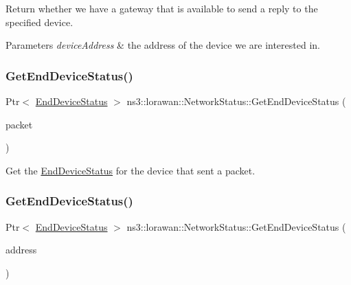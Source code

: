 Return whether we have a gateway that is available to send a reply to the specified device.


\begin{DoxyParams}{Parameters}
{\em device\+Address} & the address of the device we are interested in. \\
\hline
\end{DoxyParams}
\mbox{\label{classns3_1_1lorawan_1_1NetworkStatus_a83251eb432e1e0c22cbe4a6e2ad9ec52}} 
\subsubsection{\texorpdfstring{Get\+End\+Device\+Status()}{GetEndDeviceStatus()}\hspace{0.1cm}{\footnotesize\ttfamily [1/2]}}
{\footnotesize\ttfamily Ptr$<$ \hyperlink{classns3_1_1lorawan_1_1EndDeviceStatus}{End\+Device\+Status} $>$ ns3\+::lorawan\+::\+Network\+Status\+::\+Get\+End\+Device\+Status (\begin{DoxyParamCaption}\item[{Ptr$<$ Packet const $>$}]{packet }\end{DoxyParamCaption})}

Get the \hyperlink{classns3_1_1lorawan_1_1EndDeviceStatus}{End\+Device\+Status} for the device that sent a packet. \mbox{\label{classns3_1_1lorawan_1_1NetworkStatus_a4f75e1f86d6e90931e71d362222c39b3}} 
\subsubsection{\texorpdfstring{Get\+End\+Device\+Status()}{GetEndDeviceStatus()}\hspace{0.1cm}{\footnotesize\ttfamily [2/2]}}
{\footnotesize\ttfamily Ptr$<$ \hyperlink{classns3_1_1lorawan_1_1EndDeviceStatus}{End\+Device\+Status} $>$ ns3\+::lorawan\+::\+Network\+Status\+::\+Get\+End\+Device\+Status (\begin{DoxyParamCaption}\item[{\hyperlink{classns3_1_1lorawan_1_1LoraDeviceAddress}{Lora\+Device\+Address}}]{address }\end{DoxyParamCaption})}

